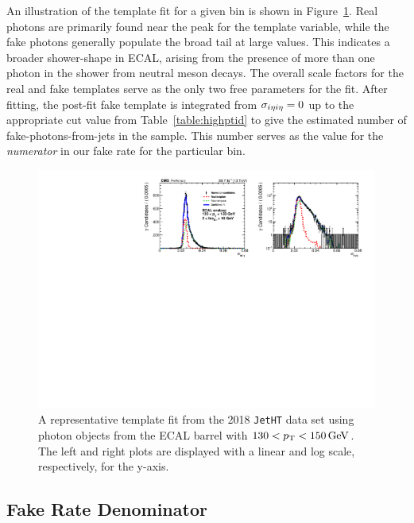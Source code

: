 An illustration of the template fit for a given \pt bin is shown in Figure~\ref{fig:templatefit}. Real photons are primarily found near the peak for the \sieie template variable, while the fake photons generally populate the broad tail at large \sieie values. This indicates a broader shower-shape in ECAL, arising from the presence of more than one photon in the shower from neutral meson decays. The overall scale factors for the real and fake templates serve as the only two free parameters for the fit. After fitting, the post-fit fake template is integrated from $\sigma_{i\eta i\eta}=0$ up to the appropriate cut value from Table~\ref{table:highptid} to give the estimated number of fake-photons-from-jets in the sample. This number serves as the value for the \emph{numerator} in our fake rate for the particular \pt bin. 

\begin{figure}[!htbp]
\centering
\includegraphics[scale=0.80]{fig/fakeRatePlot_jetht_2018_EE_pT130To150_chIso5To10.pdf}
\caption{A representative template fit from the 2018 \texttt{JetHT} data set using photon objects from the ECAL barrel with $130<p_{\mathrm{T}}<150\,\text{Ge\hspace{-.08em}V}$. The left and right plots are displayed with a linear and log scale, respectively, for the y-axis.}
\label{fig:templatefit}
\end{figure}

\subsection{Fake Rate Denominator}

